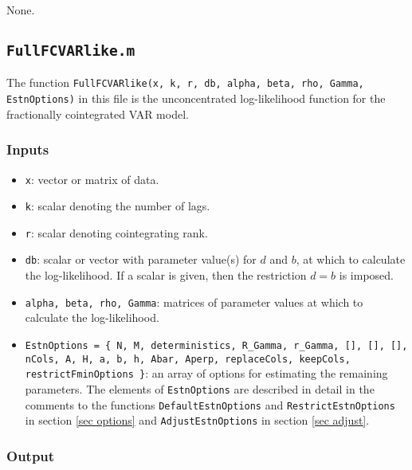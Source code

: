 \documentclass[12pt]{article}
\begin{document}
None.




\newpage


\subsection{\texttt{FullFCVARlike.m}}

The function \texttt{FullFCVARlike(x, k, r, db, alpha, beta, rho, Gamma, EstnOptions)} in this file is the unconcentrated log-likelihood function for the fractionally cointegrated VAR model. 


\subsubsection*{Inputs}

\begin{itemize}

\item \texttt{x}: vector or matrix of data.

\item \texttt{k}: scalar denoting the number of lags.

\item \texttt{r}: scalar denoting cointegrating rank.

\item \texttt{db}: scalar or vector with parameter value(s) for $d$ and $b$, at which to calculate the log-likelihood. If a scalar is given, then the restriction $d=b$ is imposed.

\item \texttt{alpha, beta, rho, Gamma}: matrices of parameter values at which to calculate the log-likelihood.

\item \texttt{EstnOptions = \{ N, M, deterministics, R\_Gamma, r\_Gamma, [], [], [], nCols, A, H, a, b, h, Abar, Aperp, replaceCols, keepCols, restrictFminOptions \}}: an array of options for estimating the remaining parameters. The elements of \texttt{EstnOptions} are described in detail in the comments to the functions \texttt{DefaultEstnOptions} and \texttt{RestrictEstnOptions} in section \ref{sec options} and \texttt{AdjustEstnOptions} in section \ref{sec adjust}. 


\end{itemize}


\subsubsection*{Output}
\end{document}
